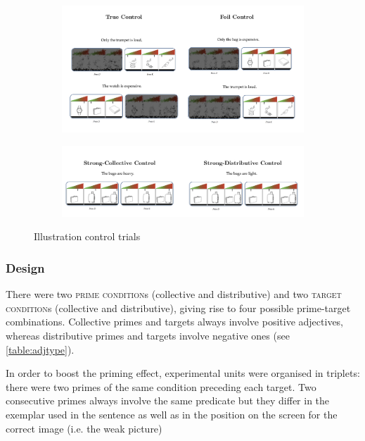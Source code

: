 \documentclass[a4paper, 11pt]{article}
\begin{document}
\begin{figure}[h!]
  \centering
  \begin{subfigure}[b]{0.8\textwidth}
    \includegraphics[width=\textwidth]{controls1.jpeg}
     \end{subfigure}
    
      \begin{subfigure}[b]{0.8\textwidth}
    \includegraphics[width=\textwidth]{controls2.jpeg}
      \end{subfigure}
      \caption{Illustration control trials}
      \label{fig.example.controls}
\end{figure}

\subsubsection{Design}
There were two \textsc{prime condition}s (collective and distributive) and two \textsc{target condition}s (collective and distributive), giving rise to four possible prime-target combinations. Collective primes and targets always involve positive adjectives, whereas distributive primes and targets involve negative ones (see \ref{table:adjtype}).

In order to boost the priming effect, experimental units were organised in triplets: there were two primes of the same condition preceding each target. Two consecutive primes always involve the same predicate but they differ in the exemplar used in the sentence as well as in the position on the screen for the correct image (i.e. the weak picture)
\end{document}
